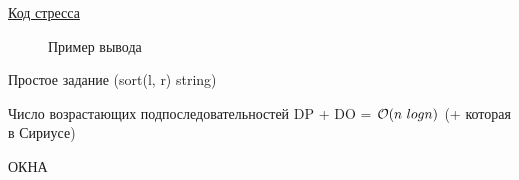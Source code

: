\down

\href{https://pastebin.com/cRGvAuPJ}{Код стресса}

\begin{center}
	\begin{figure}[h]
		\captionsetup{font=small, labelformat=empty}
		\caption{Пример вывода}
		\label{fig:image}
	\end{figure}
\end{center}


Простое задание (sort(l, r) string)

Число возрастающих подпоследовательностей DP + DO = $\mathcal{O}(n \ log n)$ (+ которая в Сириусе)

ОКНА

